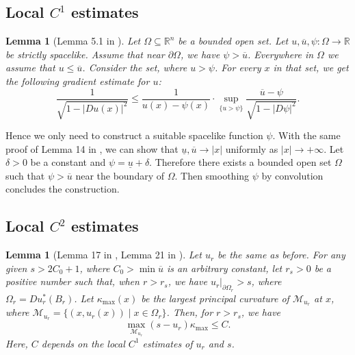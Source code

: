 \documentclass[reqno]{amsart}
\newtheorem{lemma}[theorem]{Lemma}
\theoremstyle{remark}
\theoremstyle{definition}
\numberwithin{equation}{section}
\begin{document}
\subsection{Local \texorpdfstring{$C^1$}{C1} estimates}

\begin{lemma}[Lemma 5.1 in \cite{BayardSchnürer}]\label{Local C1}
Let $\Omega \subseteq \mathbb{R}^n$ be a bounded open set. Let $u, \overline{u}, \psi : \Omega \to \mathbb{R}$ be strictly spacelike. Assume that near $\partial\Omega$, we have $\psi > \overline{u}$. Everywhere in $\Omega$ we assume that $u \leqslant \overline{u}$. Consider the set, where $u > \psi$. For every $x$ in that set, we get the following gradient estimate for $u$:
\[
\frac{1}{\sqrt{1 - |Du(x)|^2}} \leqslant \frac{1}{u(x) - \psi(x)} \cdot \sup_{\{u > \psi\}} \frac{\overline{u} - \psi}{\sqrt{1 - |D\psi|^2}}.
\]
\end{lemma}

Hence we only need to construct a suitable spacelike function $\psi$. With the same proof of Lemma 14 in \cite{Entireconstantsigmak}, we can show that $\underline{u}, \overline{u} \rightarrow \left| x \right|$ uniformly as $\left| x \right| \to +\infty$. Let $\delta>0$ be a constant and $\psi = \underline{u} + \delta$. Therefore there exists a bounded open set $\Omega$ such that $\psi > \overline{u}$ near the boundary of $\Omega$. Then smoothing $\psi$ by convolution concludes the construction.


\subsection{Local \texorpdfstring{$C^2$}{C2} estimates}

\begin{lemma}[Lemma 17 in \cite{Theprescribedcurvatureproblem}, Lemma 21 in \cite{Entireself-expanders}]
Let $u_r$ be the same as before. For any given $s > 2C_0 + 1$, where $C_0 > \min \overline{u}$ is an arbitrary constant, let $r_s > 0$ be a positive number such that, when $r > r_s$, we have $u_r |_{\partial \Omega_r} > s$, where $\Omega_r = D u_r^*(B_r)$. Let $\kappa_{\max}(x)$ be the largest principal curvature of $\mathcal{M}_{u_r}$ at $x$, where $\mathcal{M}_{u_r} = \{ (x, u_r(x)) \mid x \in \Omega_r \}$. Then, for $r > r_s$, we have
\begin{equation}
\max_{\mathcal{M}_{u_r}} \left( s-u_r \right) \kappa_{\max} \leqslant C.
\end{equation}
Here, $C$ depends on the local $C^1$ estimates of $u_r$ and $s$.
\end{lemma}
\end{document}
